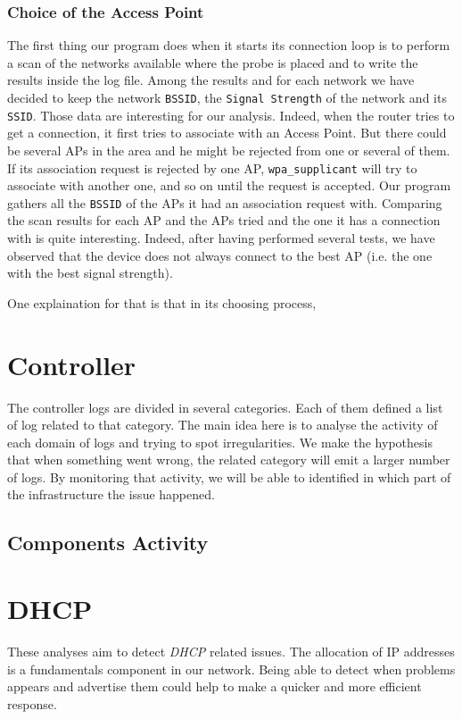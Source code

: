 \subsubsection*{Choice of the Access Point}
The first thing our program does when it starts its connection loop is to perform a scan of the networks available where the probe is placed and to write the results inside the log file. Among the results and for each network we have decided to keep the network \texttt{BSSID}, the \texttt{Signal Strength} of the network and its \texttt{SSID}. Those data are interesting for our analysis. Indeed, when the router tries to get a connection, it first tries to associate with an Access Point. But there could be several APs in the area and he might be rejected from one or several of them. If its association request is rejected by one AP, \texttt{wpa\_supplicant} will try to associate with another one, and so on until the request is accepted. Our program gathers all the \texttt{BSSID} of the APs it had an association request with. 
Comparing the scan results for each AP and the APs tried and the one it has a connection with is quite interesting. Indeed, after having performed several tests, we have observed that the device does not always connect to the best AP (i.e. the one with the best signal strength).

One explaination for that is that in its choosing process, %

\section{Controller}
The controller logs are divided in several categories. Each of them defined a list of log related to that category. The main idea here is to analyse the activity of each domain of logs and trying to spot irregularities. We make the hypothesis that when something went wrong, the related category will emit a larger number of logs. By monitoring that activity, we will be able to identified in which part of the infrastructure the issue happened.

\subsection{Components Activity}


\section{DHCP}
These analyses aim to detect \emph{DHCP} related issues. The allocation  of IP addresses is a fundamentals component in our network. Being able to detect when problems appears and advertise them could help to make a quicker and more efficient response.

